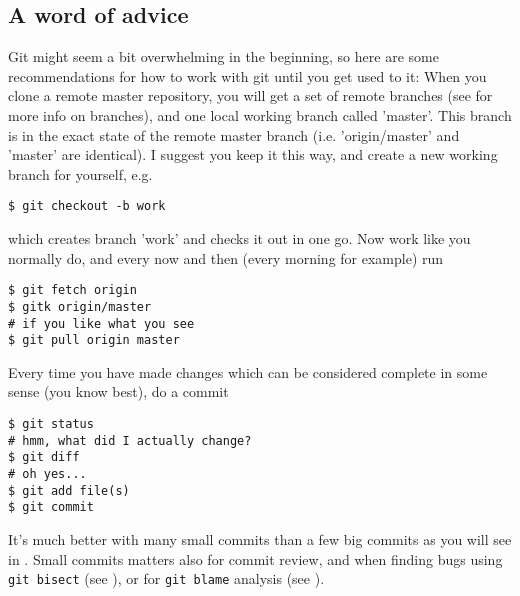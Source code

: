 \documentclass[a4paper,10pt]{article}
\begin{document}
\subsection{A word of advice}
Git might seem a bit overwhelming in the beginning, so here are
some recommendations for how to work with git until you get used to it:
When you clone a remote master repository, you will get a set of remote
branches (see  for more info on branches), and one
local working branch called 'master'. This branch is in the exact state of
the remote master branch (i.e. 'origin/master' and 'master' are identical). I
suggest you keep it this way, and create a new working branch for yourself, 
e.g.
\begin{verbatim}
$ git checkout -b work 
\end{verbatim}
which creates branch 'work' and checks it out in one go.
Now work like you normally do, and every now and then (every morning for
example) run
\begin{verbatim}
$ git fetch origin
$ gitk origin/master      
# if you like what you see
$ git pull origin master 
\end{verbatim}
Every time you have made changes which can be considered complete in some
sense (you know best), do a commit 
\begin{verbatim}
$ git status
# hmm, what did I actually change?
$ git diff
# oh yes...
$ git add file(s)
$ git commit 
\end{verbatim}
It's much better with many small commits
than a few big commits as you will see in .
Small commits matters also for commit review, and when finding bugs
using \texttt{git bisect} (see ), or for \texttt{git blame} 
analysis (see ).
\end{document}
